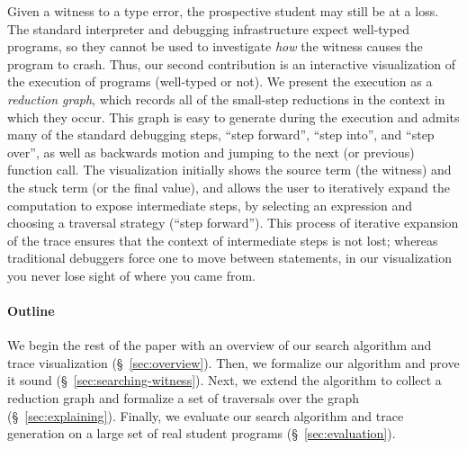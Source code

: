 Given a witness to a type error, the prospective \ocaml student may
still be at a loss.
%
The standard \ocaml interpreter and debugging infrastructure expect
well-typed programs, so they cannot be used to investigate \emph{how}
the witness causes the program to crash.
%
Thus, our second contribution is an interactive visualization of the
execution of \ocaml programs (well-typed or not).
%
We present the execution as a \emph{reduction graph}, which records
all of the small-step reductions in the context in which they occur.
%
%
This graph is easy to generate during the execution and admits many of
the standard debugging steps, \eg ``step forward'', ``step into'', and
``step over'', as well as backwards motion and jumping to the next (or
previous) function call.
%
The visualization initially shows the source term (\ie the witness) and
the stuck term (or the final value), and allows the user to iteratively
expand the computation to expose intermediate steps, by selecting an
expression and choosing a traversal strategy (\eg ``step forward'').
%
This process of iterative expansion of the trace ensures that the
context of intermediate steps is not lost; whereas traditional debuggers
force one to move between statements, in our visualization you never
lose sight of where you came from.

\paragraph{Outline}
We begin the rest of the paper with an overview of our search algorithm
and trace visualization (\S~\ref{sec:overview}).
%
Then, we formalize our algorithm and prove it sound
(\S~\ref{sec:searching-witness}).
%
Next, we extend the algorithm to collect a reduction graph and formalize
a set of traversals over the graph (\S~\ref{sec:explaining}).
%
Finally, we evaluate our search algorithm and trace generation on a
large set of real student programs (\S~\ref{sec:evaluation}).
%

